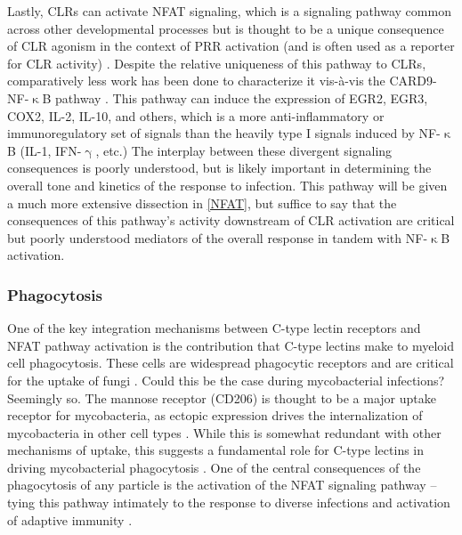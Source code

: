 Lastly, CLRs can activate NFAT signaling, which is a signaling pathway common across other developmental processes but is thought to be a unique consequence of CLR agonism in the context of PRR activation (and is often used as a reporter for CLR activity) \citep{Wilkins2004, Chow1999, Jauliac2002, Aramburu1998, HannantaAnan2016, Hooijberg2000, Goodridge2007, Goodridge2008, Bendickova2020, Fuller2007, Zhao2014}. Despite the relative uniqueness of this pathway to CLRs, comparatively less work has been done to characterize it vis\hyp{}\`{a}\hyp{}vis the CARD9\hyp{}NF\hyp{}$\upkappa$B pathway \citep{Goodridge2007, Goodridge2009, Deerhake2021}. This pathway can induce the expression of EGR2, EGR3, COX2, IL\hyp{}2, IL\hyp{}10, and others, which is a more anti\hyp{}inflammatory or immunoregulatory set of signals than the heavily type I signals induced by NF\hyp{}$\upkappa$B (IL\hyp{}1, IFN\hyp{}$\upgamma$, etc.) The interplay between these divergent signaling consequences is poorly understood, but is likely important in determining the overall tone and kinetics of the response to infection. This pathway will be given a much more extensive dissection in \autoref{NFAT}, but suffice to say that the consequences of this pathway's activity downstream of CLR activation are critical but poorly understood mediators of the overall response in tandem with NF-$\upkappa$B activation.

\subsubsection{Phagocytosis}

One of the key integration mechanisms between C\hyp{}type lectin receptors and NFAT pathway activation is the contribution that C\hyp{}type lectins make to myeloid cell phagocytosis. These cells are widespread phagocytic receptors and are critical for the uptake of fungi \citep{Robinson2006}. Could this be the case during mycobacterial infections? Seemingly so. The mannose receptor (CD206) is thought to be a major uptake receptor for mycobacteria, as ectopic expression drives the internalization of mycobacteria in other cell types \citep{Schlesinger1993}. While this is somewhat redundant with other mechanisms of uptake, this suggests a fundamental role for C\hyp{}type lectins in driving mycobacterial phagocytosis \citep{Ernst1998}. One of the central consequences of the phagocytosis of any particle is the activation of the NFAT signaling pathway -- tying this pathway intimately to the response to diverse infections and activation of adaptive immunity \citep{Khameneh2017}. 

